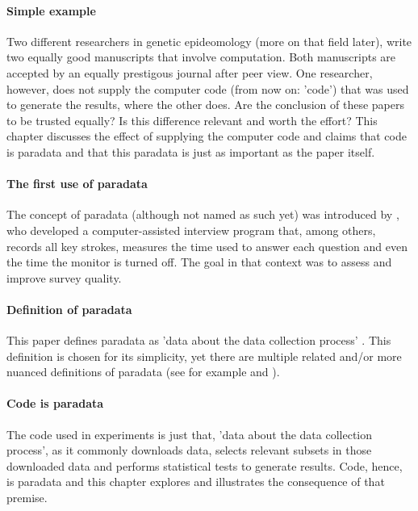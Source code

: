 
\paragraph{Simple example}

Two different researchers in genetic epideomology (more on that field later), 
write two equally good manuscripts
that involve computation.
Both manuscripts are accepted by an equally prestigous journal after peer view. 
One researcher, however, does not supply the
computer code (from now on: 'code') that was used to generate the results,
where the other does.
Are the conclusion of these papers to be trusted equally?
Is this difference relevant and worth the effort?
This chapter discusses the effect of supplying the computer 
code  
and claims that code is paradata and that this paradata 
is just as important as the paper itself.

\paragraph{The first use of paradata}

The concept of paradata (although not named as such yet) 
was introduced by \cite{couper1998measuring},
who developed a computer-assisted interview program
that, among others, records all key strokes,
measures the time used to answer each question 
and even the time the monitor is turned off.
The goal in that context was to assess and improve survey quality.

\paragraph{Definition of paradata}

This paper defines paradata as 'data about the data collection 
process' \cite{choumert2019using}.
This definition is chosen for its simplicity, 
yet there are multiple related and/or more nuanced 
definitions of paradata (see for example \cite{huvila2022improving} 
and \cite{skold2022interrogating}).

\paragraph{Code is paradata}

The code used in experiments is just that, 'data about the data collection 
process', as it commonly downloads data, selects relevant subsets in those
downloaded data and performs statistical tests to generate results.
Code, hence, is paradata and this chapter explores and illustrates the
consequence of that premise.

